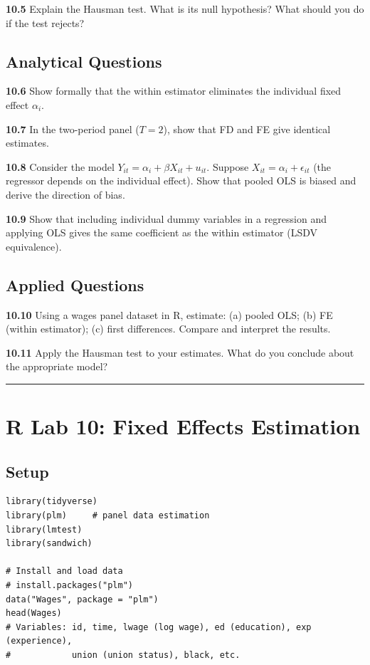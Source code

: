 \textbf{10.5} Explain the Hausman test. What is its null hypothesis? What should you do if the test rejects?

\subsection{Analytical Questions}

\textbf{10.6} Show formally that the within estimator eliminates the individual fixed effect $\alpha_i$.

\textbf{10.7} In the two-period panel ($T = 2$), show that FD and FE give identical estimates.

\textbf{10.8} Consider the model $Y_{it} = \alpha_i + \beta X_{it} + u_{it}$. Suppose $X_{it} = \alpha_i + \epsilon_{it}$ (the regressor depends on the individual effect). Show that pooled OLS is biased and derive the direction of bias.

\textbf{10.9} Show that including individual dummy variables in a regression and applying OLS gives the same coefficient as the within estimator (LSDV equivalence).

\subsection{Applied Questions}

\textbf{10.10} Using a wages panel dataset in R, estimate: (a) pooled OLS; (b) FE (within estimator); (c) first differences. Compare and interpret the results.

\textbf{10.11} Apply the Hausman test to your estimates. What do you conclude about the appropriate model?

\medskip\hrule\medskip

\section{R Lab 10: Fixed Effects Estimation}

\subsection{Setup}

\begin{lstlisting}
library(tidyverse)
library(plm)     # panel data estimation
library(lmtest)
library(sandwich)

# Install and load data
# install.packages("plm")
data("Wages", package = "plm")
head(Wages)
# Variables: id, time, lwage (log wage), ed (education), exp (experience),
#            union (union status), black, etc.
\end{lstlisting}

